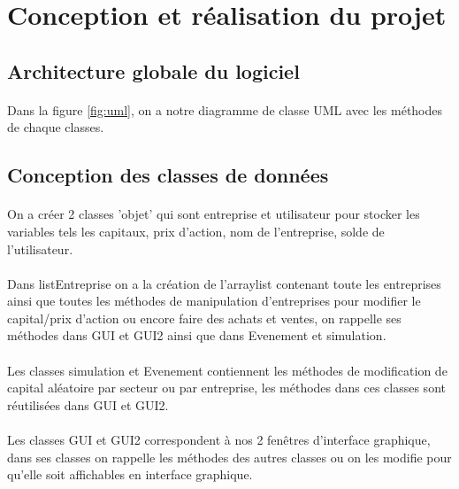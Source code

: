 \newpage
\section{Conception et réalisation du projet}
\label{sec:impl}

\subsection{Architecture globale du logiciel}
\paragraph{} Dans la figure \ref{fig:uml}, on a notre diagramme de classe UML avec les méthodes de chaque classes.



\subsection{Conception des classes de données}
\paragraph{} On a créer 2 classes 'objet' qui sont entreprise et utilisateur pour stocker les variables tels les capitaux, prix d'action, nom de l'entreprise, solde de l'utilisateur.

\paragraph{} Dans listEntreprise on a la création de l'arraylist contenant toute les entreprises ainsi que toutes les méthodes de manipulation d'entreprises pour modifier le capital/prix d'action ou encore faire des achats et ventes, on rappelle ses méthodes dans GUI et GUI2 ainsi que dans Evenement et simulation.
\paragraph{}Les classes simulation et Evenement contiennent les méthodes de modification de capital aléatoire par secteur ou par entreprise, les méthodes dans ces classes sont réutilisées dans GUI et GUI2.
\paragraph{}Les classes GUI et GUI2 correspondent à nos 2 fenêtres d'interface graphique, dans ses classes on rappelle les méthodes des autres classes ou on les modifie pour qu'elle soit affichables en interface graphique.
